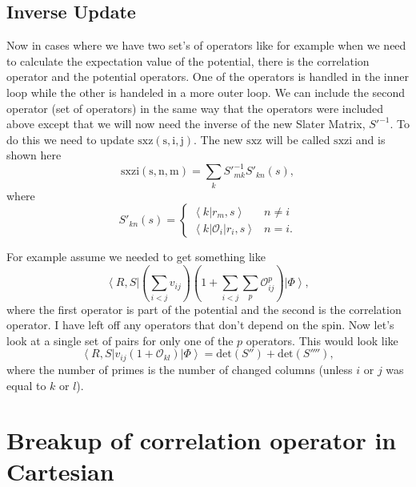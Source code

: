 \documentclass[12pt]{extarticle}
\newcommand{\Oi}{\mathcal{O}_{i}}
\newcommand{\Okl}{\mathcal{O}_{kl}}
\newcommand{\Oijp}{\mathcal{O}^p_{ij}}
\newcommand{\ket}[1]{\left| #1 \right>}
\newcommand{\bra}[1]{\left< #1 \right|}
\newcommand{\braket}[2]{\left< #1 | #2 \right>}
\begin{document}
\subsection{Inverse Update}
Now in cases where we have two set's of operators like for example when we need to calculate the expectation value of the potential, there is the correlation operator and the potential operators. One of the operators is handled in the inner loop while the other is handeled in a more outer loop. We can include the second operator (set of operators) in the same way that the operators were included above except that we will now need the inverse of the new Slater Matrix, $S'^{-1}$. To do this we need to update $\mathrm{sxz(s,i,j)}$. The new $\mathrm{sxz}$ will be called $\mathrm{sxzi}$ and is shown here
\begin{equation}
  \mathrm{sxzi(s,n,m)} = \sum_k S'^{-1}_{mk}S'_{kn}(s),
\end{equation}
where
\begin{equation}
  S'_{kn}(s) = \begin{cases}
	 \braket{k}{r_m,s} & n \neq i \\
	 \bra{k} \Oi \ket{r_i,s} & n=i.
  \end{cases}
\end{equation}






For example assume we needed to get something like
\begin{equation}
  \bra{R,S}(\sum_{i<j}v_{ij})(1+\sum_{i<j}\sum_p \Oijp) \ket{\Phi},
\end{equation}
where the first operator is part of the potential and the second is the correlation operator. I have left off any operators that don't depend on the spin. Now let's look at a single set of pairs for only one of the $p$ operators. This would look like
\begin{equation}
  \bra{R,S} v_{ij}(1+\Okl) \ket{\Phi} = \mathrm{det}(S'') + \mathrm{det}(S''''),
\end{equation}
where the number of primes is the number of changed columns (unless $i$ or $j$ was equal to $k$ or $l$).

\section{Breakup of correlation operator in Cartesian}
\end{document}
